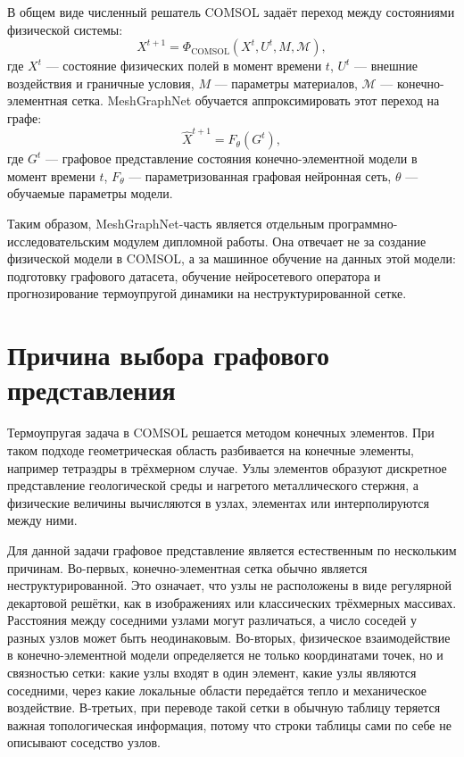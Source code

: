 В общем виде численный решатель COMSOL задаёт переход между состояниями физической системы:
\begin{equation}
    X^{t+1}=\Phi_{\mathrm{COMSOL}}\left(X^t,U^t,M,\mathcal{M}\right),
\end{equation}
где $X^t$ --- состояние физических полей в момент времени $t$, $U^t$ --- внешние воздействия и граничные условия, $M$ --- параметры материалов, $\mathcal{M}$ --- конечно-элементная сетка. MeshGraphNet обучается аппроксимировать этот переход на графе:
\begin{equation}
    \hat{X}^{t+1}=F_{\theta}\left(G^t\right),
\end{equation}
где $G^t$ --- графовое представление состояния конечно-элементной модели в момент времени $t$, $F_{\theta}$ --- параметризованная графовая нейронная сеть, $\theta$ --- обучаемые параметры модели.

Таким образом, MeshGraphNet-часть является отдельным программно-исследовательским модулем дипломной работы. Она отвечает не за создание физической модели в COMSOL, а за машинное обучение на данных этой модели: подготовку графового датасета, обучение нейросетевого оператора и прогнозирование термоупругой динамики на неструктурированной сетке.

\section{Причина выбора графового представления}

Термоупругая задача в COMSOL решается методом конечных элементов. При таком подходе геометрическая область разбивается на конечные элементы, например тетраэдры в трёхмерном случае. Узлы элементов образуют дискретное представление геологической среды и нагретого металлического стержня, а физические величины вычисляются в узлах, элементах или интерполируются между ними.

Для данной задачи графовое представление является естественным по нескольким причинам. Во-первых, конечно-элементная сетка обычно является неструктурированной. Это означает, что узлы не расположены в виде регулярной декартовой решётки, как в изображениях или классических трёхмерных массивах. Расстояния между соседними узлами могут различаться, а число соседей у разных узлов может быть неодинаковым. Во-вторых, физическое взаимодействие в конечно-элементной модели определяется не только координатами точек, но и связностью сетки: какие узлы входят в один элемент, какие узлы являются соседними, через какие локальные области передаётся тепло и механическое воздействие. В-третьих, при переводе такой сетки в обычную таблицу теряется важная топологическая информация, потому что строки таблицы сами по себе не описывают соседство узлов.

